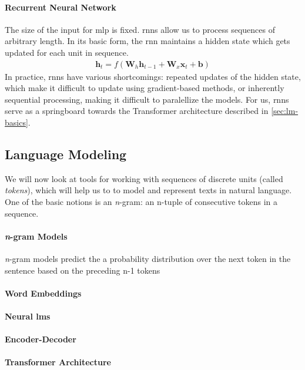 \paragraph{Recurrent Neural Network} The size of the input for \ac{mlp} is fixed. \Acp{rnn} allow us to process sequences of arbitrary length. In its basic form, the \ac{rnn} maintains a hidden state which gets updated for each unit in sequence.
\begin{align}
    \mathbf{h}_t = f(\mathbf{W}_h \mathbf{h}_{t-1} + \mathbf{W}_x \mathbf{x}_t + \mathbf{b})
\end{align}
In practice, \acp{rnn} have various shortcomings: repeated updates of the hidden state, which make it difficult to update using gradient-based methods, or inherently sequential processing, making it difficult to paralellize the models. For us, \acp{rnn} serve as a springboard towards the Transformer architecture described in \autoref{sec:lm-basics}.


\subsection{Language Modeling}
\label{sec:lm-basics}
We will now look at tools for working with sequences of discrete units (called \textit{tokens}), which will help us to to model and represent texts in natural language. One of the basic notions is an \emph{n}-gram: an n-tuple of consecutive tokens in a sequence.

\paragraph{\emph{n}-gram Models} \emph{n}-gram models predict the a probability distribution over the next token in the sentence
based on the preceding n-1 tokens

\paragraph{Word Embeddings}

\paragraph{Neural \acp{lm}}

\paragraph{Encoder-Decoder}

\paragraph{Transformer Architecture}
